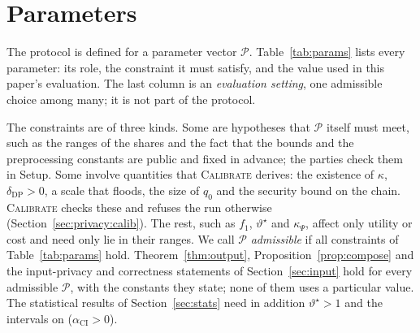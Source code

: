\documentclass[11pt]{article}
\theoremstyle{definition}
\theoremstyle{plain}
\begin{document}
\section{Parameters}
\label{sec:params}

The protocol is defined for a parameter vector $\mathcal P$. Table~\ref{tab:params} lists every parameter: its role, the constraint it must satisfy, and the value used in this paper's evaluation. The last column is an \emph{evaluation setting}, one admissible choice among many; it is not part of the protocol.

The constraints are of three kinds. Some are hypotheses that $\mathcal P$ itself must meet, such as the ranges of the shares and the fact that the bounds and the preprocessing constants are public and fixed in advance; the parties check them in Setup. Some involve quantities that \textsc{Calibrate} derives: the existence of $\kappa$, $\delta_{\mathrm{DP}} > 0$, a scale that floods, the size of $q_0$ and the security bound on the chain. \textsc{Calibrate} checks these and refuses the run otherwise (Section~\ref{sec:privacy:calib}). The rest, such as $f_1$, $\vartheta^\star$ and $\kappa_\Psi$, affect only utility or cost and need only lie in their ranges. We call $\mathcal P$ \emph{admissible} if all constraints of Table~\ref{tab:params} hold. Theorem~\ref{thm:output}, Proposition~\ref{prop:compose} and the input-privacy and correctness statements of Section~\ref{sec:input} hold for every admissible $\mathcal P$, with the constants they state; none of them uses a particular value. The statistical results of Section~\ref{sec:stats} need in addition $\vartheta^\star > 1$ and the intervals on ($\alpha_{\mathrm{CI}} > 0$).
\end{document}
